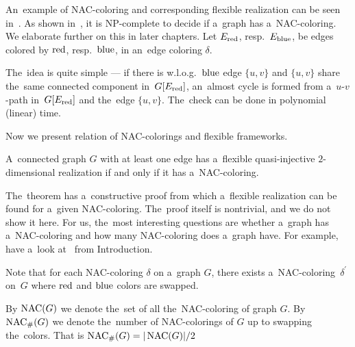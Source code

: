 An~example of NAC-coloring and corresponding flexible realization
can be seen in~.
%
As shown in~\cite{np_complete}, it is NP-complete to decide if a~graph has a~NAC-coloring.
We elaborate further on this in later chapters.
Let \( E_{\text{red}}\), resp.\ \( E_{\text{blue}} \), be edges colored by \( \text{red} \), resp.~\( \text{blue} \),
in an~edge coloring \( \delta \).
%
%
The~idea is quite simple --- if there is w.l.o.g.\ \( \text{blue} \) edge \( \{u, v\} \)
and \( \{u, v\} \) share the~same connected component in~\( G[E_{\text{red}}] \),
an~almost cycle is formed from a~\( u \)-\( v \)-path in~\( G[E_{\text{red}}] \)
and the~edge \( \{u, v\} \).
The~check can be done in polynomial (linear) time.

Now we present relation of NAC-colorings and flexible frameworks.
%
\begin{theorem}
	A~connected graph \( G \) with at least one edge has a~flexible
	quasi-injective \( 2 \)-dimensional realization if and only if it has a~NAC-coloring.
\end{theorem}
%
The~theorem has a~constructive proof from which a~flexible realization
can be found for a~given NAC-coloring.
The~proof itself is nontrivial, and we do not show it here.
For us, the~most interesting questions are whether a~graph has a~NAC-coloring
and how many NAC-coloring does a~graph have.
For example, have a~look at~
from Introduction.

Note that for each NAC-coloring \( \delta \) on a~graph \( G \),
there exists a~NAC-coloring~\( \delta^\prime \) on~\( G \)
where \( \text{red} \) and \( \text{blue} \) colors are swapped.
%
\begin{definition}
	By \( \operatorname{NAC}(G) \) we denote the~set of all the~NAC-coloring of graph \( G \).
	By \( \operatorname{NAC}_{\#} (G) \) we denote the~number of NAC-colorings of \( G \)
	up to swapping the~colors.
	That is \( \operatorname{NAC}_{\#} (G) = | \operatorname{NAC}(G) | / 2 \)
\end{definition}
%

